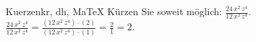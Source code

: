 \begin{MAufgabe}{Kuerzen}{kr, dh, MaTeX}
K\"urzen Sie soweit m\"oglich: $\frac{24\, x^2\, z^4}{12\, x^2\, z^4}$.\\ 
\ifLsg\MLoesung
\quad $\frac{24\, x^2\, z^4}{12\, x^2\, z^4}=\frac{(12\, x^2\, z^4)\cdot(2)}{(12\, x^2\, z^4)\cdot(1)}=\frac{2}{1}=2$.\else\relax\fi
 \end{MAufgabe}